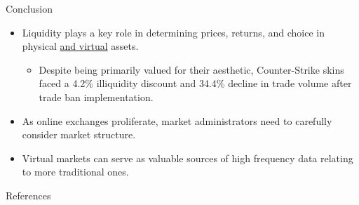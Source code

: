\documentclass[xcolor=table, envcountsect,12pt]{beamer}
\theoremstyle{remark}
\theoremstyle{theorem}
\theoremstyle{plain}
\begin{document}
\begin{frame}{Conclusion}
	\begin{itemize}
		\item Liquidity plays a key role in determining prices, returns, and choice in physical \underline{and virtual} assets.
		\begin{itemize}
			\item Despite being primarily valued for their aesthetic, Counter-Strike skins faced a 4.2\% illiquidity discount  and 34.4\% decline in trade volume after trade ban implementation.
		\end{itemize}
		\item As online exchanges proliferate, market administrators need to carefully consider market structure.
		\item Virtual markets can serve as valuable sources of high frequency data relating to more traditional ones.
	\end{itemize}
\end{frame}


\begin{frame}[allowframebreaks]{References}
    \printbibliography
\end{frame}
\end{document}
